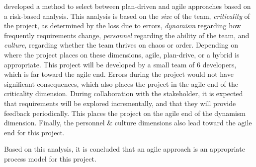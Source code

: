  developed a method to select between plan-driven and agile approaches based on a risk-based analysis.
This analysis is based on the \textit{size} of the team, \textit{criticality} of the project, as determined by the loss due to errors, \textit{dynamism} regarding how frequently requirements change, \textit{personnel} regarding the ability of the team, and \textit{culture}, regarding whether the team thrives on chaos or order. Depending on where the project places on these dimensions, agile, plan-drive, or a hybrid is appropriate.
This project will be developed by a small team of 6 developers, which is far toward the agile end.
Errors during the project would not have significant consequences, which also places the project in the agile end of the criticality dimension.
During collaboration with the stakeholder, it is expected that requirements will be explored incrementally, and that they will provide feedback periodically. This places the project on the agile end of the dynamism dimension.
Finally, the personnel \& culture dimensions also lead toward the agile end for this project.\cite{boehmObservationsBalancingDiscipline}

Based on this analysis, it is concluded that an agile approach is an appropriate process model for this project.

